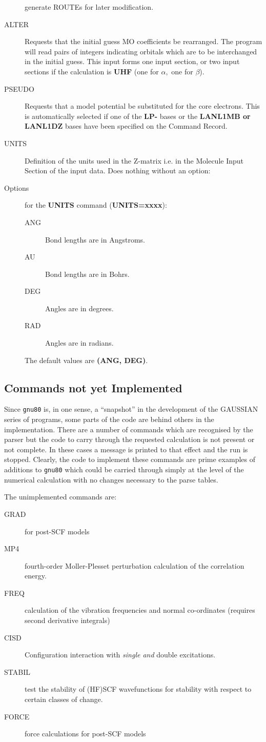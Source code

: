 \begin{description}
generate ROUTEs for later modification.
\item[ALTER] Requests that the initial guess MO coefficients be rearranged.
The program will read pairs of integers indicating orbitals
which are to be interchanged in the initial guess. This input
forms one input section, or two input sections if the
calculation is {\bf UHF} (one for $\alpha,$ one for $\beta$).
\item[PSEUDO] Requests that a model potential be substituted for the core
electrons. This is automatically selected if one of the {\bf LP-}
bases or the {\bf LANL1MB or LANL1DZ} 
bases have been specified on the Command Record.
\item[UNITS]  Definition of the units used in the Z-matrix
i.e. in the Molecule Input Section of the input data. Does nothing
without an option:
\item[Options] for the {\bf UNITS} command ({\bf UNITS=xxxx}):
\begin{description}
\item[ANG] Bond lengths are in Angstroms.
\item[AU] Bond lengths are in Bohrs.
\item[DEG] Angles are in degrees.
\item[RAD] Angles are in radians.
\end{description}
The default values are {\bf (ANG, DEG)}.
\end{description}
\newpage
\subsection{\sf Commands not yet Implemented}
Since {\tt gnu80} is, in one sense, a ``snapshot'' in the development
of the GAUSSIAN series of programs, some parts of the code are behind
others in the implementation. There are a number of commands which are
recognised by the parser but the code to carry through the requested
calculation is not present or not complete. In these cases a
message is printed to that effect and the run is stopped. Clearly, the
code to implement these commands are prime examples of additions to
{\tt gnu80} which could be carried through simply at the
level of the numerical calculation with no changes necessary to
the parse tables.

The unimplemented commands are:
\begin{description}
\item[GRAD] for post-SCF models
\item[MP4] fourth-order Moller-Plesset perturbation calculation
of the correlation energy.
\item[FREQ] calculation of the vibration frequencies and
normal co-ordinates (requires second derivative integrals)
\item[CISD] Configuration interaction with {\em single and} double
excitations.
\item[STABIL] test the stability of (HF)SCF wavefunctions for
stability with respect to certain classes of change.
\item[FORCE] force calculations for post-SCF models
\end{description}
